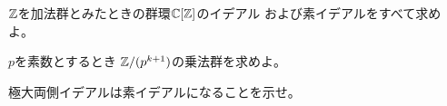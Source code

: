 \documentclass[report]{jlreq}
\begin{document}
\begin{problem}[代数学II 2.33]
    $\mathbb{Z}$を加法群とみたときの群環$\mathbb{C}[\mathbb{Z}]$のイデアル
    および素イデアルをすべて求めよ。
\end{problem}

\begin{answer}
    \TODO{}
\end{answer}


\begin{problem}[代数学II 2.34]
    $p$を素数とするとき
    $\mathbb{Z} / (p^{k + 1})$の乗法群を求めよ。
\end{problem}

\begin{answer}
    \TODO{}
\end{answer}

\begin{problem}[代数学II 2.35]
    極大両側イデアルは素イデアルになることを示せ。
\end{problem}

\begin{answer}
    \TODO{}
\end{answer}


\end{document}

